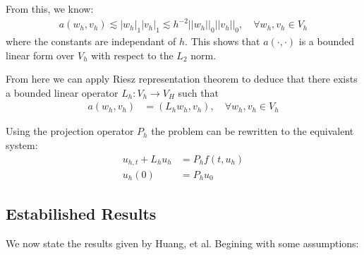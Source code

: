 From this, we know:
\begin{align*}
    a(w_h, v_h) \lesssim |w_h|_1|v_h|_1 \lesssim h^{-2} ||w_h||_0||v_h||_0, \quad \forall w_h, v_h \in V_h \label{bilinear}
\end{align*}
where the constants are independant of $h$.
This shows that $a(\cdot,\cdot)$ is a bounded linear form over $V_h$ with respect to the $L_2$ norm.

From here we can apply Riesz representation theorem to deduce that there exists a bounded linear operator $L_h:V_h\rightarrow V_H$ such that
\begin{align*}
    a(w_h, v_h) &= (L_h w_h, v_h), \quad \forall w_h, v_h \in V_h
\end{align*}

Using the projection operator $P_h$ the problem can be rewritten to the equivalent system:
\begin{align*}
    u_{h,t} + L_hu_h &= P_hf(t,u_h)\\
    u_h(0) &= P_hu_0
\end{align*}

\subsection{Estabilished Results}
We now state the results given by Huang, et al\cite{Huang2022}.
Begining with some assumptions:

